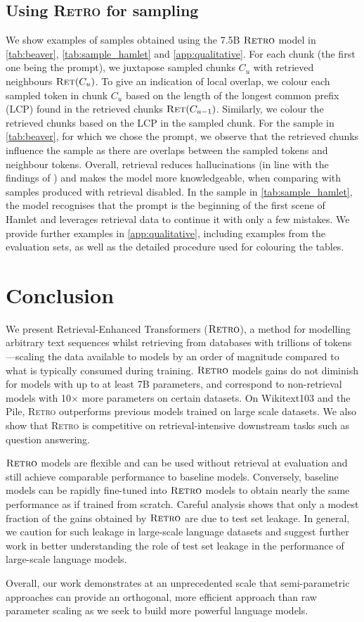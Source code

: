 \subsection{Using \textsc{Retro} for sampling} We show examples of samples obtained using the 7.5B $\textsc{Retro}$ model in \autoref{tab:beaver}, \autoref{tab:sample_hamlet} and \autoref{app:qualitative}. For each chunk (the first one being the prompt), we juxtapose sampled chunks $C_u$ with retrieved neighbours $\textsc{Ret}(C_{u})$.
To give an indication of local overlap, we colour each sampled token in chunk $C_u$ based on the length of the longest common prefix (LCP) found in the retrieved chunks $\textsc{Ret}(C_{u-1})$.
Similarly, we colour the retrieved chunks based on the LCP in the sampled chunk. For the sample in \autoref{tab:beaver}, for which we chose the prompt, we observe that the retrieved chunks influence the sample as there are overlaps between the sampled tokens and neighbour tokens. Overall, retrieval reduces hallucinations (in line with the findings of \citet{shuster_retrieval_2021}) and makes the model more knowledgeable, when comparing with samples produced with retrieval disabled. In the sample in \autoref{tab:sample_hamlet}, the model recognises that the prompt is the beginning of the first scene of Hamlet and leverages retrieval data to continue it with only a few mistakes. We provide further examples in \autoref{app:qualitative}, including examples from the evaluation sets, as well as the detailed procedure used for colouring the tables.

\section{Conclusion}
We present Retrieval-Enhanced Transformers ($\textsc{Retro}$), a method for modelling arbitrary text sequences whilst retrieving from databases with trillions of tokens---scaling the data available to models by an order of magnitude compared to what is typically consumed during training.
$\textsc{Retro}$ models gains do not diminish for models with up to at least 7B parameters, and correspond to non-retrieval models with 10$\times$ more parameters on certain datasets. On Wikitext103 and the Pile, \textsc{Retro} outperforms previous models trained on large scale datasets. We also show that \textsc{Retro} is competitive on retrieval-intensive downstream tasks such as question answering. 

$\textsc{Retro}$ models are flexible and can be used without retrieval at evaluation and still achieve comparable performance to baseline models. Conversely, baseline models can be rapidly fine-tuned into $\textsc{Retro}$ models to obtain nearly the same performance as if trained from scratch. Careful analysis shows that only a modest fraction of the gains obtained by $\textsc{Retro}$ are due to test set leakage. In general, we caution for such leakage in large-scale language datasets and suggest further work in better understanding the role of test set leakage in the performance of large-scale language models.

Overall, our work demonstrates at an unprecedented scale that semi-parametric approaches can provide an orthogonal, more efficient approach than raw parameter scaling as we seek to build more powerful language models.


